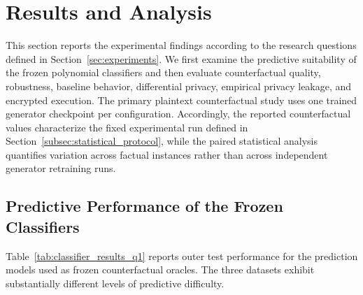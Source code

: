 \documentclass[preprint,12pt]{elsarticle}
\begin{document}
\section{Results and Analysis}
\label{sec:results}

This section reports the experimental findings according to the research
questions defined in Section~\ref{sec:experiments}. We first examine the
predictive suitability of the frozen polynomial classifiers and then evaluate
counterfactual quality, robustness, baseline behavior, differential privacy,
empirical privacy leakage, and encrypted execution. The primary plaintext
counterfactual study uses one trained generator checkpoint per configuration.
Accordingly, the reported counterfactual values characterize the fixed
experimental run defined in Section~\ref{subsec:statistical_protocol}, while
the paired statistical analysis quantifies variation across factual instances
rather than across independent generator retraining runs.

\subsection{Predictive Performance of the Frozen Classifiers}
\label{subsec:classifier_results}

Table~\ref{tab:classifier_results_q1} reports outer test performance for the
prediction models used as frozen counterfactual oracles. The three datasets
exhibit substantially different levels of predictive difficulty.

\begin{table}[!ht]
\centering
\caption{Outer test predictive performance of the frozen classifiers.}
\label{tab:classifier_results_q1}
\end{table}
\end{document}

